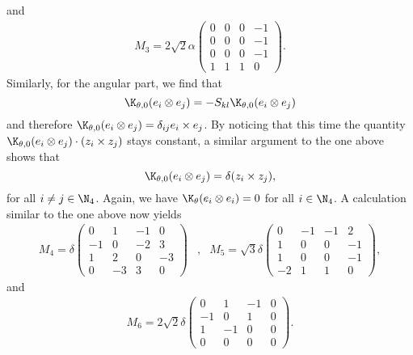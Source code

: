 and
\begin{align}
\label{eq: M3}
M_3 = 2 \sqrt{2} \alpha \left (
\begin{array}{cccc}
0 & 0 & 0 & -1 \\ 
0 & 0 & 0 & -1 \\ 
0 & 0 & 0 & -1 \\ 
1 & 1 & 1 & 0
\end{array} 
\right ).
\end{align}
Similarly, for the angular part, we find that
\begin{equation}
	\K_{\theta, 0}(e_i \otimes e_j) = - S_{kl} \K_{\theta,0}(e_i \otimes e_j)
\end{equation}
and therefore $\K_{\theta,0}(e_i \otimes e_j) = \delta_{ij} e_i \times e_j$. By noticing that this time the quantity $\K_{\theta,0}(e_i \otimes e_j) \cdot (z_i \times z_j)$ stays constant, a similar argument to the one above shows that
\begin{equation}
\K_{\theta,0}(e_i \otimes e_j) = \delta (z_i \times z_j),
\end{equation}
for all $i \neq j \in \N_4$. Again, we have $\K_{\theta}(e_i \otimes e_i) = 0$ for all $i \in \N_4$. A calculation similar to the one above now yields
\begin{align}
\label{eq: M4 and M5}
	M_4 = \delta \left (
	\begin{array}{cccc}
	0 & 1 & -1 & 0 \\ 
	-1 & 0 & -2 & 3 \\ 
	1 & 2 & 0 & -3 \\ 
	0 & -3 & 3 & 0
	\end{array} 
	\right ) &, & M_5 = \sqrt{3} \delta \left ( \begin{array}{cccc}
	0 & -1 & -1 & 2 \\ 
	1 & 0 & 0 & -1 \\ 
	1 & 0 & 0 & -1 \\ 
	-2 & 1 & 1 & 0
	\end{array} \right ) ,
\end{align}
and
\begin{align}
\label{eq: M6}
M_6 = 2 \sqrt{2} \delta \left (\begin{array}{cccc}
0 & 1 & -1 & 0 \\ 
-1 & 0 & 1 & 0 \\ 
1 & -1 & 0 & 0 \\ 
0 & 0 & 0 & 0
\end{array}  \right ).
\end{align}

